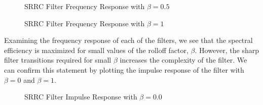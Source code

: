\documentclass{article}
\begin{document}
\begin{figure}[H]
	\centerline{}
	\caption{SRRC Filter Frequency Response with $\beta=0.5$}
	\label{fig::srrc_freq_response_beta_0_5}
\end{figure}

\begin{figure}[H]
	\centerline{}
	\caption{SRRC Filter Frequency Response with $\beta=1$}
	\label{fig::srrc_freq_response_beta_1}
\end{figure}

\noindent Examining the frequency response of each of the filters, we see that the spectral efficiency is maximized for small values of the rolloff factor, $\beta$. However, the sharp filter transitions required for small $\beta$ increases the complexity of the filter. We can confirm this statement by plotting the impulse response of the filter with $\beta=0$ and $\beta=1$.

\begin{figure}[H]
	\centerline{}
	\caption{SRRC Filter Impulse Response with $\beta=0.0$}
	\label{fig::srrc_impulse_response_beta_0}
\end{figure}
\end{document}
